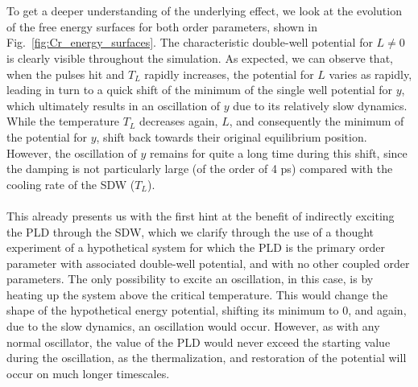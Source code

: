 \\\\
To get a deeper understanding of the underlying effect, we look at the evolution of the free energy surfaces for both order parameters, shown in Fig.~\ref{fig:Cr_energy_surfaces}.
The characteristic double-well potential for $L\neq0$  is clearly visible throughout the simulation.
As expected, we can observe that, when the pulses hit and $T_L$ rapidly increases, the potential for $L$ varies as rapidly, leading in turn to a quick shift of the minimum of the single well potential for $y$, which ultimately results in an oscillation of $y$ due to its relatively slow dynamics.
While the temperature $T_L$ decreases again, $L$, and consequently the minimum of the potential for $y$, shift back towards their original equilibrium position.
However, the oscillation of $y$ remains for quite a long time during this shift, since the damping is not particularly large (of the order of 4 ps) compared with the cooling rate of the SDW ($T_L$).
\\\\
This already presents us with the first hint at the benefit of indirectly exciting the PLD through the SDW, which we clarify through the use of a thought experiment of a hypothetical system for which the PLD is the primary order parameter with associated double-well potential, and with no other coupled order parameters.
The only possibility to excite an oscillation, in this case, is by heating up the system above the critical temperature.
This would change the shape of the hypothetical energy potential, shifting its minimum to 0, and again, due to the slow dynamics, an oscillation would occur.
However, as with any normal oscillator, the value of the PLD would never exceed the starting value during the oscillation, as the thermalization, and restoration of the potential will occur on much longer timescales.

